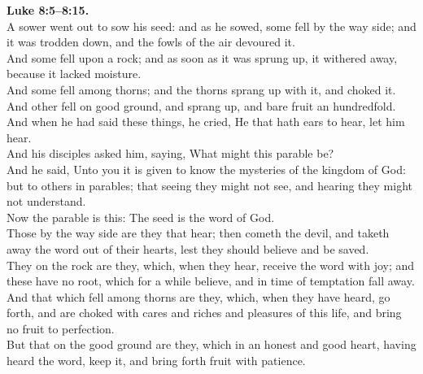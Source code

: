 \documentclass[10pt]{article} %
\begin{document}
{\begin{minipage}[t]{0.45\textwidth}
\textbf{Luke 8:5--8:15.}\\
A sower went out to sow his seed: and as he sowed, some fell by the way side; and it was trodden down, and the fowls of the air devoured it.\\
And some fell upon a rock; and as soon as it was sprung up, it withered away, because it lacked moisture.\\
And some fell among thorns; and the thorns sprang up with it, and choked it.\\
And other fell on good ground, and sprang up, and bare fruit an hundredfold. And when he had said these things, he cried, He that hath ears to hear, let him hear.\\
And his disciples asked him, saying, What might this parable be?\\
And he said, Unto you it is given to know the mysteries of the kingdom of God: but to others in parables; that seeing they might not see, and hearing they might not understand.\\
Now the parable is this: The seed is the word of God.\\
Those by the way side are they that hear; then cometh the devil, and taketh away the word out of their hearts, lest they should believe and be saved.\\
They on the rock are they, which, when they hear, receive the word with joy; and these have no root, which for a while believe, and in time of temptation fall away.\\
And that which fell among thorns are they, which, when they have heard, go forth, and are choked with cares and riches and pleasures of this life, and bring no fruit to perfection.\\
But that on the good ground are they, which in an honest and good heart, having heard the word, keep it, and bring forth fruit with patience.\\

\end{minipage}}
\vspace*{\fill}
\newpage
\huge%
\vspace*{\fill}
\end{document}
